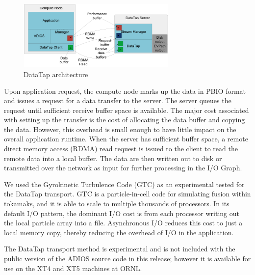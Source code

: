 \begin{figure}[htbp]
\begin{center}
\includegraphics[width=222pt, height=97pt]{ADIOS-Manual-fig022.png}
\caption{DataTap architecture}
\end{center}
\end{figure}\label{HRef119578596}\label{HToc144350171}


\vspace{10pt}
Upon application request, the compute node marks up the data in PBIO format and 
issues a request for a data transfer to the server. The server queues the request 
until sufficient receive buffer space is available. The major cost associated with 
setting up the transfer is the cost of allocating the data buffer and copying the 
data. However, this overhead is small enough to have little impact on the overall 
application runtime. When the server has sufficient buffer space, a remote direct 
memory access (RDMA) read request is issued to the client to read the remote data 
into a local buffer. The data are then written out to disk or transmitted over 
the network as input for further processing in the I/O Graph. 

\vspace{10pt}
We used the Gyrokinetic Turbulence Code (GTC) as an experimental tested for the 
DataTap transport. GTC is a particle-in-cell code for simulating fusion within 
tokamaks, and it is able to scale to multiple thousands of processors. In its default 
I/O pattern, the dominant I/O cost is from each processor writing out the local 
particle array into a file. Asynchronous I/O reduces this cost to just a local 
memory copy, thereby reducing the overhead of I/O in the application.

\vspace{10pt}
The DataTap transport method is experimental and is not included with the public 
version of the ADIOS source code in this release; however it is available for use 
on the XT4 and XT5 machines at ORNL.\label{HToc84890267}\label{HToc212016643}\label{HToc212016885}\label{HToc182553392}

\vspace{10pt}
